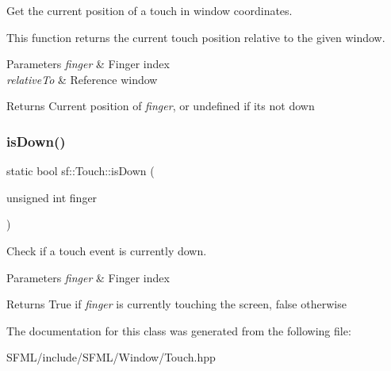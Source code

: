 Get the current position of a touch in window coordinates. 

This function returns the current touch position relative to the given window.


\begin{DoxyParams}{Parameters}
{\em finger} & Finger index \\
\hline
{\em relative\+To} & Reference window\\
\hline
\end{DoxyParams}
\begin{DoxyReturn}{Returns}
Current position of {\itshape finger}, or undefined if it\textquotesingle{}s not down \begin{DoxyVerb}\end{DoxyVerb}
 
\end{DoxyReturn}
\mbox{\label{classsf_1_1_touch_a2f85297123ea4e401d02c346e50d48a3}} 
\subsubsection{\texorpdfstring{isDown()}{isDown()}}
{\footnotesize\ttfamily static bool sf\+::\+Touch\+::is\+Down (\begin{DoxyParamCaption}\item[{unsigned int}]{finger }\end{DoxyParamCaption})\hspace{0.3cm}{\ttfamily [static]}}



Check if a touch event is currently down. 


\begin{DoxyParams}{Parameters}
{\em finger} & Finger index\\
\hline
\end{DoxyParams}
\begin{DoxyReturn}{Returns}
True if {\itshape finger} is currently touching the screen, false otherwise \begin{DoxyVerb}\end{DoxyVerb}
 
\end{DoxyReturn}


The documentation for this class was generated from the following file\+:\begin{DoxyCompactItemize}
\item 
S\+F\+M\+L/include/\+S\+F\+M\+L/\+Window/Touch.\+hpp\end{DoxyCompactItemize}
